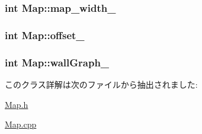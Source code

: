 \hypertarget{class_map_a1c47ff15c93974ddf3ef05f7bdee1571}{
\subsubsection[{map\+\_\+width\+\_\+}]{\setlength{\rightskip}{0pt plus 5cm}int Map\+::map\+\_\+width\+\_\+\hspace{0.3cm}{\ttfamily [private]}}}\label{class_map_a1c47ff15c93974ddf3ef05f7bdee1571}
\hypertarget{class_map_a02557959c8b2b59592b673a356424e63}{
\subsubsection[{offset\+\_\+}]{\setlength{\rightskip}{0pt plus 5cm}int Map\+::offset\+\_\+\hspace{0.3cm}{\ttfamily [private]}}}\label{class_map_a02557959c8b2b59592b673a356424e63}
\hypertarget{class_map_a3d03c3930a3d2d4c9d7609ae46a730ea}{
\subsubsection[{wall\+Graph\+\_\+}]{\setlength{\rightskip}{0pt plus 5cm}int Map\+::wall\+Graph\+\_\+\hspace{0.3cm}{\ttfamily [private]}}}\label{class_map_a3d03c3930a3d2d4c9d7609ae46a730ea}


このクラス詳解は次のファイルから抽出されました\+:\begin{DoxyCompactItemize}
\item 
\hyperlink{_map_8h}{Map.\+h}\item 
\hyperlink{_map_8cpp}{Map.\+cpp}\end{DoxyCompactItemize}
